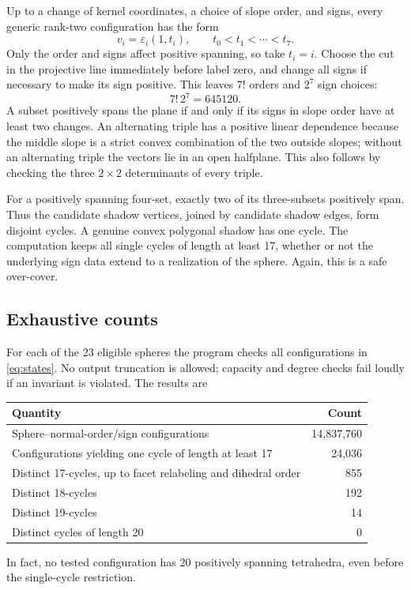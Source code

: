 \documentclass[11pt]{article}
\theoremstyle{definition}
\begin{document}
Up to a change of kernel coordinates, a choice of slope order, and signs, every generic rank-two configuration has the form
\[
 v_i=\varepsilon_i(1,t_i),\qquad t_0<t_1<\cdots<t_7.
\]
Only the order and signs affect positive spanning, so take $t_i=i$. Choose the cut in the projective line immediately before label zero, and change all signs if necessary to make its sign positive. This leaves $7!$ orders and $2^7$ sign choices:
\begin{equation}\label{eq:states}
 7!\,2^7=645120.
\end{equation}
A subset positively spans the plane if and only if its signs in slope order have at least two changes. An alternating triple has a positive linear dependence because the middle slope is a strict convex combination of the two outside slopes; without an alternating triple the vectors lie in an open halfplane. This also follows by checking the three $2\times2$ determinants of every triple.

For a positively spanning four-set, exactly two of its three-subsets positively span. Thus the candidate shadow vertices, joined by candidate shadow edges, form disjoint cycles. A genuine convex polygonal shadow has one cycle. The computation keeps all single cycles of length at least 17, whether or not the underlying sign data extend to a realization of the sphere. Again, this is a safe over-cover.

\subsection{Exhaustive counts}
For each of the 23 eligible spheres the program checks all configurations in \eqref{eq:states}. No output truncation is allowed; capacity and degree checks fail loudly if an invariant is violated. The results are
\begin{center}
\begin{tabular}{lr}
\toprule
Quantity&Count\\\midrule
Sphere--normal-order/sign configurations&14,837,760\\
Configurations yielding one cycle of length at least 17&24,036\\
Distinct 17-cycles, up to facet relabeling and dihedral order&855\\
Distinct 18-cycles&192\\
Distinct 19-cycles&14\\
Distinct cycles of length 20&0\\
\bottomrule
\end{tabular}
\end{center}
In fact, no tested configuration has 20 positively spanning tetrahedra, even before the single-cycle restriction.
\end{document}
